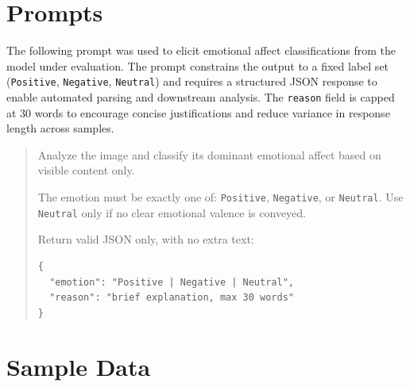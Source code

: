 \documentclass[11pt]{article}
\begin{document}
\section{Prompts}
\label{app:b}

The following prompt was used to elicit emotional affect classifications from the model under evaluation. 
The prompt constrains the output to a fixed label set (\texttt{Positive}, \texttt{Negative}, \texttt{Neutral}) 
and requires a structured JSON response to enable automated parsing and downstream analysis. 
The \texttt{reason} field is capped at 30 words to encourage concise justifications 
and reduce variance in response length across samples.

\begin{quote}
Analyze the image and classify its dominant emotional affect based on visible content only.

\medskip
\noindent The emotion must be exactly one of: \texttt{Positive}, \texttt{Negative}, or \texttt{Neutral}. Use \texttt{Neutral} only if no clear emotional valence is conveyed.

\medskip
\noindent Return valid JSON only, with no extra text:

\begin{verbatim}
{
  "emotion": "Positive | Negative | Neutral",
  "reason": "brief explanation, max 30 words"
}
\end{verbatim}
\end{quote}

\section{Sample Data}
\label{app:c}
\end{document}

